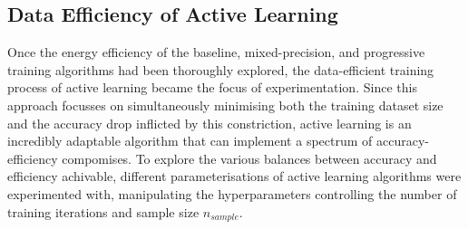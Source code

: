 \documentclass[a4paper, 11pt]{report}
\begin{document}
    \subsection{Data Efficiency of Active Learning}

    Once the energy efficiency of the baseline, mixed-precision, and progressive training algorithms had been thoroughly explored, the data-efficient training process of active learning became the focus of experimentation. Since this approach focusses on simultaneously minimising both the training dataset size and the accuracy drop inflicted by this constriction, active learning is an incredibly adaptable algorithm that can implement a spectrum of accuracy-efficiency compomises. To explore the various balances between accuracy and efficiency achivable, different parameterisations of active learning algorithms were experimented with, manipulating the hyperparameters controlling the number of training iterations and sample size $n_{sample}$. 
\end{document}
